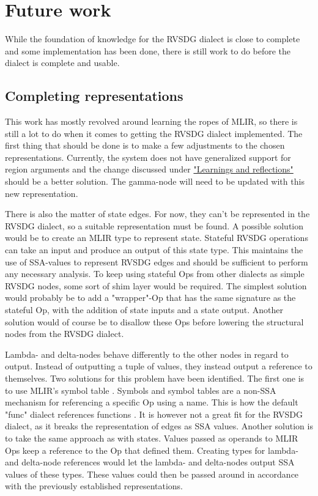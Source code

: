 \section{Future work}
While the foundation of knowledge for the RVSDG dialect is close to complete and some implementation has been done, there is still work to do before the dialect is complete and usable.

\subsection{Completing representations} \label{sec:future-work:copleting-representations}
This work has mostly revolved around learning the ropes of MLIR, so there is still a lot to do when it comes to getting the RVSDG dialect implemented. The first thing that should be done is to make a few adjustments to the chosen representations. Currently, the system does not have generalized support for region arguments and the change discussed under \hyperref[sec:learnings]{"Learnings and reflections"} should be a better solution. The gamma-node will need to be updated with this new representation.

There is also the matter of state edges. For now, they can't be represented in the RVSDG dialect, so a suitable representation must be found. A possible solution would be to create an MLIR type to represent state. Stateful RVSDG operations can take an input and produce an output of this state type. This maintains the use of SSA-values to represent RVSDG edges and should be sufficient to perform any necessary analysis. To keep using stateful Ops from other dialects as simple RVSDG nodes, some sort of shim layer would be required. The simplest solution would probably be to add a "wrapper"-Op that has the same signature as the stateful Op, with the addition of state inputs and a state output. Another solution would of course be to disallow these Ops before lowering the structural nodes from the RVSDG dialect.

Lambda- and delta-nodes behave differently to the other nodes in regard to output. Instead of outputting a tuple of values, they instead output a reference to themselves. Two solutions for this problem have been identified. The first one is to use MLIR's symbol table \cite{mlir_symbol_table}. Symbols and symbol tables are a non-SSA mechanism for referencing a specific Op using a name. This is how the default "func" dialect references functions \cite{mlir_func_dialect}. It is however not a great fit for the RVSDG dialect, as it breaks the representation of edges as SSA values. Another solution is to take the same approach as with states. Values passed as operands to MLIR Ops keep a reference to the Op that defined them. Creating types for lambda- and delta-node references would let the lambda- and delta-nodes output SSA values of these types. These values could then be passed around in accordance with the previously established representations. 

